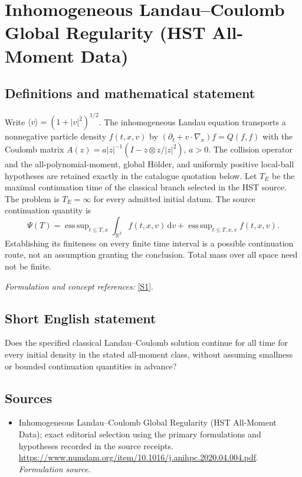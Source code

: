 \documentclass[11pt]{article}
\begin{document}
\section*{\texorpdfstring{Inhomogeneous Landau–Coulomb Global Regularity (HST All-Moment Data)}{Inhomogeneous Landau–Coulomb Global Regularity (HST All-Moment Data)}}\label{30006773}
\subsection{Definitions and mathematical statement}
Write $\langle v\rangle=(1+|v|^2)^{1/2}$. The inhomogeneous Landau equation transports a nonnegative particle density $f(t,x,v)$ by
$(\partial_t+v\cdot\nabla_x)f=Q(f,f)$ with the Coulomb matrix
$A(z)=a|z|^{-1}(I-z\otimes z/|z|^2)$, $a>0$. The collision operator and the all-polynomial-moment, global H\"older, and uniformly positive local-ball hypotheses are retained exactly in the catalogue quotation below. Let $T_E$ be the maximal continuation time of the classical branch selected in the HST source. The problem is $T_E=\infty$ for every admitted initial datum. The source continuation quantity is
\[
 \Psi(T)=\mathop{\mathrm{ess\,sup}}_{t\le T,x}\int_{{\mathbb{R}}^3}f(t,x,v){\,\mathrm{d}} v
 +\mathop{\mathrm{ess\,sup}}_{t\le T,x,v}f(t,x,v).
\]
Establishing its finiteness on every finite time interval is a possible continuation route, not an assumption granting the conclusion. Total mass over all space need not be finite.
\par\smallskip\textit{Formulation and concept references:} \href{https://www.numdam.org/item/10.1016/j.anihpc.2020.04.004.pdf}{[S1]}.

\subsection{Short English statement}
Does the specified classical Landau–Coulomb solution continue for all time for every initial density in the stated all-moment class, without assuming smallness or bounded continuation quantities in advance?
\subsection{Sources}
\begin{itemize}
\item[S1]Inhomogeneous Landau–Coulomb Global Regularity (HST All-Moment Data); exact editorial selection using the primary formulations and hypotheses recorded in the source receipts.
\url{https://www.numdam.org/item/10.1016/j.anihpc.2020.04.004.pdf}.
\textit{Formulation source.}
\end{itemize}
\end{document}
